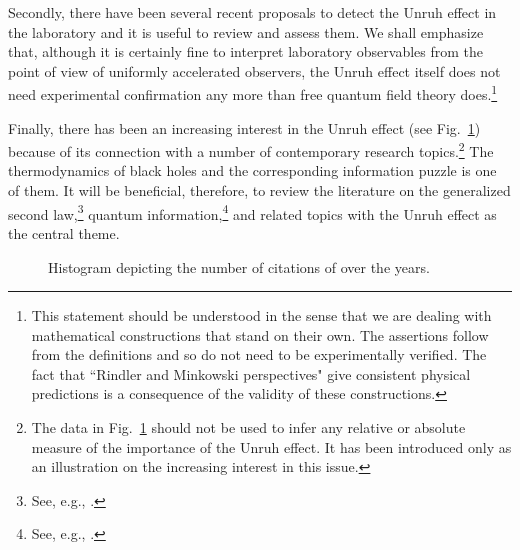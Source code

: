 \documentclass[12pt,nofootinbib,floatfix,aps,prd,showpacs,amsmath,amssymb,eqsecnum]{revtex4-2}
\begin{document}
Secondly, there have been several recent proposals to detect the
Unruh effect in the laboratory and it is useful to review and assess 
them. We shall emphasize that, although it is certainly fine to interpret 
laboratory observables from the point of view of uniformly accelerated 
observers, the Unruh effect 
itself does not need experimental confirmation any more than free 
quantum field theory does.\footnote{This statement should be understood
in the sense that we are dealing with mathematical constructions that 
stand on their own. The assertions follow from the definitions and so  
do not need to be experimentally verified. The fact that ``Rindler and 
Minkowski perspectives" give consistent physical predictions is a 
consequence of the validity of these constructions.}

Finally, there has been an increasing interest in the Unruh effect 
(see Fig.~\ref{citationunruh}) because of its connection with a number of 
contemporary research topics.\footnote{The data in 
Fig.~\ref{citationunruh} should 
not be used to infer any relative or absolute measure of the importance 
of the Unruh effect. It has been introduced only as an illustration on the
increasing interest in this issue.} The thermodynamics of black holes 
and the corresponding information puzzle is one of them. It will be beneficial, 
therefore, to review the literature on the 
generalized second law,\footnote{See, e.g., 
                                 \textcite{UnruhWald82,UnruhWald83,Wald01}.
                                 }
quantum information,\footnote{See, e.g., 
                              \textcite{Bousso02,Peresetal04}.
                              }
and related topics with the Unruh effect as the central theme. 
\begin{figure}[t]
\caption{\label{citationunruh} Histogram depicting the number 
of citations of \textcite{Unruh76} over the years.}
\end{figure}
\end{document}
